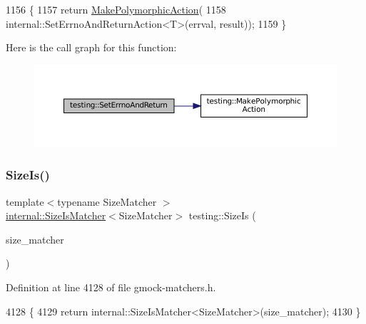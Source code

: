 \begin{DoxyCode}
1156                                         \{
1157   \textcolor{keywordflow}{return} \hyperlink{namespacetesting_a36bd06c5ea972c6df0bd9f40a7a94c65}{MakePolymorphicAction}(
1158       internal::SetErrnoAndReturnAction<T>(errval, result));
1159 \}
\end{DoxyCode}
Here is the call graph for this function\+:
\nopagebreak
\begin{figure}[H]
\begin{center}
\leavevmode
\includegraphics[width=350pt]{namespacetesting_a31095e421f167fade2e6d4d60df1f4da_cgraph}
\end{center}
\end{figure}
\mbox{\label{namespacetesting_acd5e215558f95f1393c048a6d496060d}} 
\subsubsection{\texorpdfstring{Size\+Is()}{SizeIs()}}
{\footnotesize\ttfamily template$<$typename Size\+Matcher $>$ \\
\hyperlink{classtesting_1_1internal_1_1SizeIsMatcher}{internal\+::\+Size\+Is\+Matcher}$<$Size\+Matcher$>$ testing\+::\+Size\+Is (\begin{DoxyParamCaption}\item[{const Size\+Matcher \&}]{size\+\_\+matcher }\end{DoxyParamCaption})\hspace{0.3cm}{\ttfamily [inline]}}



Definition at line 4128 of file gmock-\/matchers.\+h.


\begin{DoxyCode}
4128                                         \{
4129   \textcolor{keywordflow}{return} internal::SizeIsMatcher<SizeMatcher>(size\_matcher);
4130 \}
\end{DoxyCode}
\mbox{\label{namespacetesting_ae0502232432b1fe8361d296c6de6beda}} 
